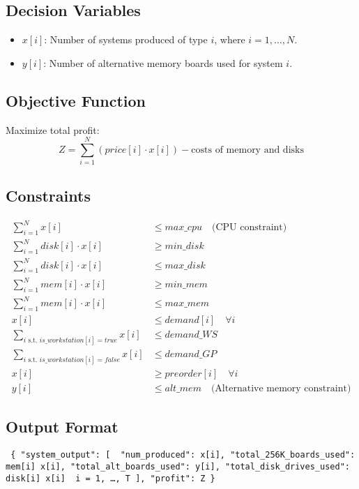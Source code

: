 \documentclass{article}
\begin{document}
\subsection*{Decision Variables}
\begin{itemize}
    \item $x[i]$: Number of systems produced of type $i$, where $i = 1, \ldots, N$.
    \item $y[i]$: Number of alternative memory boards used for system $i$.
\end{itemize}

\subsection*{Objective Function}
Maximize total profit:
\[
Z = \sum_{i=1}^{N} (price[i] \cdot x[i]) - \text{costs of memory and disks}
\]

\subsection*{Constraints}
\begin{align}
    \sum_{i=1}^{N} x[i] & \leq max\_cpu \quad \text{(CPU constraint)} \\
    \sum_{i=1}^{N} disk[i] \cdot x[i] & \geq min\_disk \\
    \sum_{i=1}^{N} disk[i] \cdot x[i] & \leq max\_disk \\
    \sum_{i=1}^{N} mem[i] \cdot x[i] & \geq min\_mem \\
    \sum_{i=1}^{N} mem[i] \cdot x[i] & \leq max\_mem \\
    x[i] & \leq demand[i] \quad \forall i \\
    \sum_{i \text{ s.t. } is\_workstation[i]=true} x[i] & \leq demand\_WS \\
    \sum_{i \text{ s.t. } is\_workstation[i]=false} x[i] & \leq demand\_GP \\
    x[i] & \geq preorder[i] \quad \forall i \\
    y[i] & \leq alt\_mem \quad \text{(Alternative memory constraint)}
\end{align}

\subsection*{Output Format}
\texttt{
\{
    "system\_output": [
        {
            "num\_produced": x[i],
            "total\_256K\_boards\_used": mem[i] \cdot x[i],
            "total\_alt\_boards\_used": y[i],
            "total\_disk\_drives\_used": disk[i] \cdot x[i]
        }
         i = 1, \ldots, T
    ],
    "profit": Z
\}
}
\end{document}
